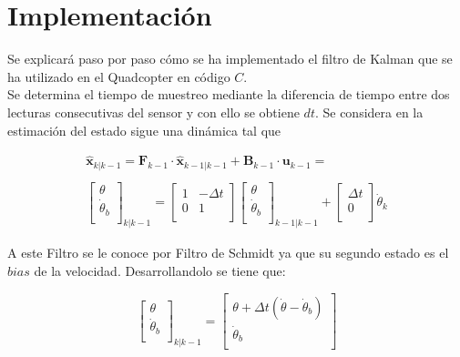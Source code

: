 \documentclass[twoside,11pt]{book}
\begin{document}
\section*{Implementación}

Se explicará paso por paso cómo se ha implementado el filtro de Kalman que se ha utilizado en el Quadcopter en código $C$.  \\

Se determina el tiempo de muestreo mediante la diferencia de tiempo entre dos lecturas consecutivas del sensor y con ello se obtiene $dt$. Se considera en la estimación del estado sigue una dinámica tal que 

\begin{equation}
\begin{array}{c}
\hat{\mathbf{x}}_{k|k-1}=\mathbf{F}_{k-1} \cdot \hat{\mathbf{x}}_{k-1|k-1} + \mathbf{B}_{k-1}\cdot \mathbf{u}_{k-1}= \\
\\ \left[ \begin{array}{c}
\theta \\
\dot{\theta}_{b} \\ \end{array} \right]_{k|k-1} = \left[ \begin{array}{cc}
1 & -\Delta t \\
0 & 1  \\ \end{array} \right]  \left[ \begin{array}{c}
\theta \\
\dot{\theta}_{b} \\ \end{array} \right]_{k-1|k-1} + \left[ \begin{array}{c}
\Delta t \\
0 \\ \end{array} \right]  \dot{\theta}_{k}
\end{array}
\end{equation}

A este Filtro se le conoce por Filtro de Schmidt ya que su segundo estado es el $bias$ de la velocidad. Desarrollandolo se tiene que:

\begin{equation}
\left[ \begin{array}{c}
\theta \\
\dot{\theta}_{b} \\ \end{array} \right]_{k|k-1} = \left[ \begin{array}{c}
\theta + \Delta t(\dot{\theta}-\dot{\theta}_{b}) \\
\dot{\theta}_{b} \\ \end{array} \right]
\label{9.20}
\end{equation}
\end{document}
